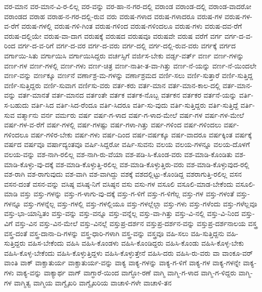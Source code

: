 {ವರ-ಮಾನ
ವರ-ಮಾನ-ವಿ-ರ-ಲಿಲ್ಲ
ವರ-ವನ್ನು
ವರ-ಹಾ-ನ-ಗರ-ದಲ್ಲಿ
ವರಾಂಡ
ವರಾಂಡ-ದಲ್ಲಿ
ವರಾಂಡ-ವಾದರೋ
ವರಾಂಡದ
ವರಾಹ
ವರಾಹ-ನ-ಗರ-ದಲ್ಲಿ-ರುವ
ವರು
ವರುಷ-ಗಳಾದ
ವರುಷ-ಗಳಾದರೂ
ವರುಷ-ಗಳ
ವರುಷ-ಗಳ-ವ-ರೆಗೆ
ವರುಷ-ಗಳಲ್ಲಿ
ವರುಷ-ಗಳಿ-ಗಿಂತ
ವರುಷ-ಗಳಿಂದ
ವರುಷ-ಗಳಿಂದಲೂ
ವರುಷ-ಗಳು
ವರುಷ-ದವ-ರೆಗೆ
ವರುಷ-ದಲ್ಲಿಯೇ
ವರುಷ-ವಾ-ದಾಗ
ವರುಷಕ್ಕೆ
ವರುಷದ
ವರುಷವೂ
ವರುಷವೇ
ವರುಷ
ವರೆಗೆ
ವರ್ಗ
ವರ್ಗ-ದ-ವ-ರಿಂದ
ವರ್ಗ-ದ-ವ-ರಿಗೆ
ವರ್ಗ-ದ-ವರ
ವರ್ಗ-ದ-ವರು
ವರ್ಗ-ದಲ್ಲಿ
ವರ್ಗ-ದಲ್ಲಿ-ರುವ-ವರು
ವರ್ಗಕ್ಕೆ
ವರ್ಗದ
ವರ್ಗಾಯಿ-ಸಿತು
ವರ್ಗಾಯಿಸಿ
ವರ್ಗಾಯಿಸಿದ್ದರು
ವರ್ಚಸ್ಸಿಗೆ
ವರ್ಜಿಸ-ಬೇಕು
ವರ್ಡ್ಸ-ವರ್ತ್
ವರ್ಣ
ವರ್ಣ-ಗಳನ್ನು
ವರ್ಣ-ಗಳ
ವರ್ಣ-ಗಳಲ್ಲಿ
ವರ್ಣ-ಗಳು
ವರ್ಣ-ಚಿತ್ರ
ವರ್ಣ-ನಾತೀ-ತ-ವಾ-ಗಿತ್ತು
ವರ್ಣ-ನೆ-ಯನ್ನು
ವರ್ಣ-ನೆ-ಯಿಂದಲೇ
ವರ್ಣ-ವನ್ನು
ವರ್ಣಕ್ಕೂ
ವರ್ಣನೆ
ವರ್ಣಾಶ್ರ-ಮ-ಗಳನ್ನು
ವರ್ಣಾಶ್ರಮದ
ವರ್ಣಿ-ಸಲು
ವರ್ಣಿ-ಸುತ್ತಾರೆ
ವರ್ಣಿ-ಸುತ್ತಿದ್ದ
ವರ್ಣಿ-ಸುತ್ತಿದ್ದರು
ವರ್ಣಿ-ಸುವಾಗ
ವರ್ಣಿಸು-ವರು
ವರ್ತ-ಕರು
ವರ್ತ-ಮಾನ
ವರ್ತ-ಮಾನ-ಕಾಲ-ದಲ್ಲಿ
ವರ್ತ-ಮಾನ-ವನ್ನು
ವರ್ತ-ಮಾನತೆ
ವರ್ತ-ಮಾನದ
ವರ್ತಂತೇ
ವರ್ತಕ
ವರ್ತಕ-ನೊಬ್ಬ
ವರ್ತಕನ
ವರ್ತಕರ
ವರ್ತನೆ-ಯನ್ನು
ವರ್ತಿ-ಸ-ಬಹುದು
ವರ್ತಿ-ಸಿದ
ವರ್ತಿ-ಸಿದ-ರೆಂದೂ
ವರ್ತಿ-ಸಿದರೂ
ವರ್ತಿ-ಸು-ವುದು
ವರ್ತಿ-ಸುತ್ತಿದ್ದರು
ವರ್ತಿ-ಸುತ್ತಿದ್ದೆ
ವರ್ತಿ-ಸುವ
ವರ್ತ್ಮಾನು
ವರ್ನ
ವರ್ಮರು
ವರ್ಷ
ವರ್ಷ-ಗ-ಳಾದ
ವರ್ಷ-ಗ-ಳಾದ-ಮೇಲೆ
ವರ್ಷ-ಗಳ
ವರ್ಷ-ಗಳ-ಮೇಲೆ
ವರ್ಷ-ಗಳ-ವ-ರೆಗೆ
ವರ್ಷ-ಗಳಲ್ಲಿ
ವರ್ಷ-ಗಳಷ್ಟು
ವರ್ಷ-ಗಳಾ-ಗಿತ್ತು
ವರ್ಷ-ಗಳಿಂದ
ವರ್ಷ-ಗಳಿಂದಲು
ವರ್ಷ-ಗಳಿಂದಲೂ
ವರ್ಷ-ಗಳಿರ-ಬೇಕು
ವರ್ಷ-ಗಳು
ವರ್ಷ-ದಿಂದ
ವರ್ಷ-ವರ್ಷಕ್ಕೂ
ವರ್ಷ-ವಾದರೂ
ವರ್ಷಕ್ಕಿಂತ
ವರ್ಷಕ್ಕೆ
ವರ್ಷದ
ವರ್ಷವೂ
ವರ್ಷಾದ್ಯಂತವೂ
ವರ್ಷಿ-ಸಿದ್ದರೋ
ವರ್ಷಿ-ಸುವನು
ವಲಯ
ವಲಯ-ಗಳನ್ನೂ
ವಲಯ-ದೊಳಗೆ
ವಲಯ-ವನ್ನು
ವಶ-ನಾಗಿ-ರಲಿಲ್ಲ
ವಶ-ನಾಗಿ-ರು-ವೆಯಾ
ವಶ-ಪಡಿ-ಸಿ-ಕೊಂಡ-ವರು
ವಶ-ಮಾಡಿ-ಕೊಂಡಿತು
ವಶ-ಮಾಡಿ-ಕೊಳ್ಳು-ವು-ದಕ್ಕೆ
ವಶ-ಮಾಡಿ-ಕೊಳ್ಳುತ್ತಿ-ರಲಿಲ್ಲ
ವಶ-ಮಾಡಿ-ಕೊಳ್ಳುತ್ತಿರು-ವರು
ವಶ-ಮಾಡಿ-ಕೊಳ್ಳುವುದ-ರಲ್ಲಿ
ವಶ-ರಾಗಿ
ವಶ-ರಾಗುವುದು
ವಶ-ವಾಗಿ
ವಶ-ವಾಗಿದ್ದು
ವಶಕ್ಕೆ
ವಶದಲ್ಲಿಟ್ಟು-ಕೊಂಡಿದ್ದ
ವಶರಾಗುತ್ತಿ-ರಲಿಲ್ಲ
ವಸನ
ವಸನ-ದಂತೆ
ವಸನ-ವನ್ನು
ವಸಿಷ್ಠ
ವಸಿಷ್ಠ-ನಿಗೆ
ವಸಿಷ್ಠನ
ವಸು
ವಸು-ಗಳ
ವಸೂಲಿ
ವಸೂಲಿ-ಮಾಡ-ಬೇಕೆಂದು
ವಸೂಲಿ-ಮಾಡಿ
ವಸ್ತು
ವಸ್ತು-ಗಳನ್ನು
ವಸ್ತು-ಗ-ಳಾಗು-ವು-ದಕ್ಕೆ
ವಸ್ತು-ಗ-ಳಿಗೆ
ವಸ್ತು-ಗ-ಳಿಗೆಲ್ಲ
ವಸ್ತು-ಗಳ
ವಸ್ತು-ಗಳಂತೆ
ವಸ್ತು-ಗಳನ್ನೂ
ವಸ್ತು-ಗಳನ್ನೆಲ್ಲ
ವಸ್ತು-ಗಳಲ್ಲಿ
ವಸ್ತು-ಗಳಲ್ಲಿಯೂ
ವಸ್ತು-ಗಳಲ್ಲೆಲ್ಲಾ
ವಸ್ತು-ಗಳು
ವಸ್ತು-ಗಳೆಂದು
ವಸ್ತು-ಗಳೆಲ್ಲವೂ
ವಸ್ತು-ಭಾ-ಯಾನ್ವಿತಂ
ವಸ್ತು-ವನ್ನು
ವಸ್ತು-ವನ್ನೂ
ವಸ್ತು-ವನ್ನೆಲ್ಲ
ವಸ್ತು-ವಾ-ಗಿತ್ತು
ವಸ್ತು-ವಿ-ನಲ್ಲಿ
ವಸ್ತು-ವಿ-ನಿಂದ
ವಸ್ತು-ವಿಗೆ
ವಸ್ತು-ವಿನ
ವಸ್ತು-ವಿನ-ಮೇಲೆ
ವಸ್ತು-ವಿನಲ್ಲೆ
ವಸ್ತುಪ್ರ-ದರ್ಶನ
ವಸ್ತುಪ್ರ-ದರ್ಶನ-ವನ್ನು
ವಸ್ತುಪ್ರ-ದರ್ಶನಾಲಯ
ವಸ್ತ್ರ
ವಸ್ತ್ರ-ದಂತೆ
ವಸ್ತ್ರ-ದಾನಾ-ದಿ-ಗಳನ್ನು
ವಸ್ತ್ರ-ಧಾರಿ-ಗಳಾಗಿ
ವಸ್ತ್ರ-ವನ್ನು
ವಸ್ತ್ರವೂ
ವಹಿ-ಸಲು
ವಹಿ-ಸುತ್ತಿದ್ದನು
ವಹಿ-ಸುತ್ತಿದ್ದರು
ವಹಿಸ-ಬೇಕೆಂದು
ವಹಿಸಿ
ವಹಿಸಿ-ಕೊಂಡಳು
ವಹಿಸಿ-ಕೊಂಡಿದ್ದರು
ವಹಿಸಿ-ಕೊಂಡು
ವಹಿಸಿ-ಕೊಳ್ಳ-ಬೇಕು
ವಹಿಸಿ-ಕೊಳ್ಳ-ಬೇಕೆಂದು
ವಹಿಸಿ-ಕೊಳ್ಳುತ್ತಿದ್ದಳು
ವಹಿಸಿ-ಕೊಳ್ಳುತ್ತೇನೆ
ವಹಿಸಿ-ದರು
ವಹಿಸಿ-ರು-ವರು
ವಾ
ವಾಂಕೂ-ವರ್
ವಾಂತಿ
ವಾಕ್
ವಾಕ್ಚಾತುರ್ಯ
ವಾಕ್ಚಾತುರ್ಯ-ವನ್ನು
ವಾಕ್ಯ
ವಾಕ್ಯ-ಗಳನ್ನು
ವಾಕ್ಯ-ಗ-ಳಿಗೆ
ವಾಕ್ಯ-ಗಳ
ವಾಕ್ಯ-ಗಳನ್ನೇ
ವಾಕ್ಯ-ಗಳು
ವಾಕ್ಯ-ವನ್ನು
ವಾಕ್ಯಾರ್ಥ
ವಾಗ್
ವಾಗ್ಧಾರೆ-ಯಿಂದ
ವಾಗ್ಧೋ-ರಣೆ
ವಾಗ್ಮಿ
ವಾಗ್ಮಿ-ಗ-ಳಾದ
ವಾಗ್ಮಿ-ಗ-ಳಿದ್ದರು
ವಾಗ್ಮಿ-ಗಳ
ವಾಗ್ಮಿತ್ವ
ವಾಗ್ಮಿಯ
ವಾಗ್ವೈಖರಿ
ವಾಗ್ವೈಖರಿಯ
ವಾಚಾಳಿ-ಗಳೇ
ವಾಚಾಳಿ-ತನ
}
